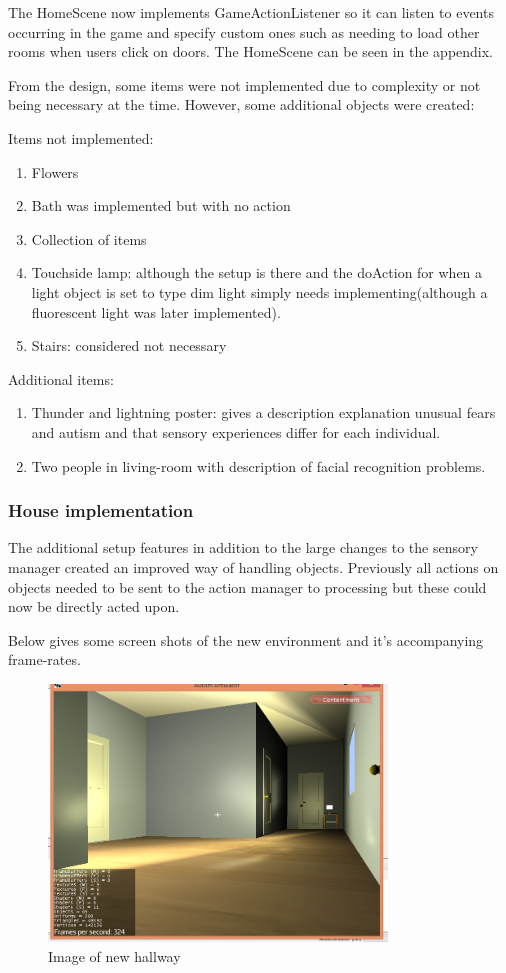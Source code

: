\documentclass[11pt]{report}
\begin{document}
The HomeScene now implements GameActionListener so it can listen to events occurring in the game and specify custom ones such as needing to load other rooms when users click on doors. The HomeScene can be seen in the appendix.

From the design, some items were not implemented due to complexity or not being necessary at the time. However, some additional objects were created:

Items not implemented:
\begin{enumerate}
\item Flowers
\item Bath was implemented but with no action
\item Collection of items
\item Touchside lamp: although the setup is there and the doAction for when a light object is set to type dim light simply needs implementing(although a fluorescent light was later implemented).
\item Stairs: considered not necessary
\end{enumerate}

Additional items:
\begin{enumerate}
\item Thunder and lightning poster: gives a description explanation unusual fears and autism and that sensory experiences differ for each individual. 
\item Two people in living-room with description of facial recognition problems.
\end{enumerate}


\subsubsection{House implementation}
The additional setup features in addition to the large changes to the sensory manager created an improved way of handling objects. Previously all actions on objects needed to be sent to the action manager to processing but these could now be directly acted upon. 

Below gives some screen shots of the new environment and it's accompanying frame-rates. 


\begin{figure}[H]
\centering
\includegraphics[width=90mm]{images/new_hallway1.png}
\caption{Image of new hallway}
\label{newhallway}
\end{figure}
\end{document}
